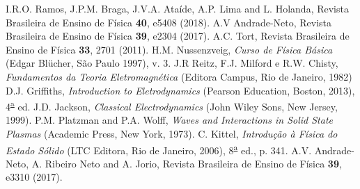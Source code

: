 \documentclass[brazilian,10.7pt,a4paper]{article}
\begin{document}
\begin{multicols}{2}
\begin{thebibliography}{10}
I.R.O. Ramos, J.P.M. Braga, J.V.A. Ataíde, A.P. Lima and L. Holanda, Revista Brasileira de Ensino de Física \textbf{40}, e5408 (2018).
A.V Andrade-Neto, Revista Brasileira de Ensino de Física \textbf{39}, e2304 (2017).
A.C. Tort, Revista Brasileira de Ensino de Física \textbf{33}, 2701 (2011).
H.M. Nussenzveig, \textit{Curso de Física Básica} (Edgar Blücher, São Paulo 1997), v. 3.
J.R Reitz, F.J. Milford e R.W. Chisty, \textit{Fundamentos da Teoria Eletromagnética} (Editora Campus, Rio de Janeiro, 1982)
D.J. Griffiths, \textit{Introduction to Eletrodynamics} (Pearson Education, Boston, 2013), 4\textsuperscript{\underline{a}} ed.
J.D. Jackson, \textit{Classical Electrodynamics} (John Wiley Sons, New Jersey, 1999).
P.M. Platzman and P.A. Wolff, \textit{Waves and Interactions in Solid State Plasmas} (Academic Press, New York, 1973).
C. Kittel, \textit{Introdução à Física do Estado Sólido} (LTC Editora, Rio de Janeiro, 2006), 8\textsuperscript{\underline{a}} ed., p. 341.
A.V. Andrade-Neto, A. Ribeiro Neto and A. Jorio, Revista Brasileira de Ensino de Física \textbf{39}, e3310 (2017).
\end{thebibliography}
\end{multicols}
\end{document}

